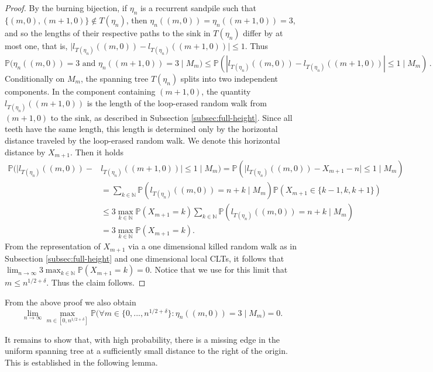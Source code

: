 \documentclass[11pt]{article}
\newcommand{\N}{\mathbb{N}}
\newcommand{\Prob}{\mathbb{P}}
\begin{document}
\begin{proof}
    By the burning bijection, if $\eta_n$ is a recurrent sandpile such that $\{(m,0),(m+1,0)\}\notin T(\eta_n)$, then $\eta_n((m,0))=\eta_n((m+1,0))=3$, and so the lengths of their respective paths to the sink in $T(\eta_n)$ differ by at most one, that is,  $\vert l_{T(\eta_n)}((m,0))-l_{T(\eta_n)}((m+1,0))\vert\leq 1$. Thus
    \[
    \Prob\big(\eta_n((m,0))=3\text{ and }\eta_n((m+1,0))=3\;\vert\; M_m\big)\leq \Prob(|l_{T(\eta_n)}((m,0))-l_{T(\eta_n)}((m+1,0))|\leq 1\;\vert\; M_m)\,.
    \]
    Conditionally on $M_m$, the spanning tree $T(\eta_n)$ splits into two independent components. In the component containing $(m+1,0)$, the quantity $l_{T(\eta_n)}((m+1,0))$ is the length of the loop-erased random walk from $(m+1,0)$ to the sink, as described in Subsection \ref{subsec:full-height}. Since all teeth have the same length, this length is determined only by the horizontal distance traveled by the loop-erased random walk. We denote this horizontal distance by $X_{m+1}$. Then it holds
    \begin{align*}
        \Prob\big(|l_{T(\eta_n)}((m,0))-&l_{T(\eta_n)}((m+1,0))|\leq 1\;\vert\; M_m\big)=\Prob(\vert l_{T(\eta_n)}((m,0))-X_{m+1}-n\vert\leq 1\;\vert\;M_m)\\&=\sum_{k\in\N}\Prob(l_{T(\eta_n)}((m,0))=n+k\;\vert\;M_m)\Prob(X_{m+1}\in\{k-1,k,k+1\})
        \\&\leq 3\max_{k\in\N}\Prob(X_{m+1}=k) \sum_{k\in\N}\Prob(l_{T(\eta_n)}((m,0))=n+k\;\vert\;M_m)\\&=3\max_{k\in\N}\Prob(X_{m+1}=k).
    \end{align*}
    From the representation of $X_{m+1}$ via a one dimensional killed random walk as in Subsection \ref{subsec:full-height} and one dimensional local CLTs, it follows that $\lim_{n\to\infty}3\max_{k\in\N}\Prob(X_{m+1}=k)=0$. Notice that we use for this limit that $m\leq n^{1/2+\delta}$. Thus the claim follows.
\end{proof}
From the above proof we also obtain
\begin{equation}\label{eq:pb-missing-edge}
    \lim_{n\to\infty}\max_{m\in[0,n^{1/2+\delta}]}\Prob\Big(\forall m\in\{0,...,n^{1/2+\delta}\}:\eta_n((m,0))=3\;\big\vert\;M_m\Big)=0.
\end{equation}

It remains to show that, with high probability, there is a missing edge in the uniform spanning tree at a sufficiently small distance to the right of the origin. This is established in the following lemma.
\end{document}
